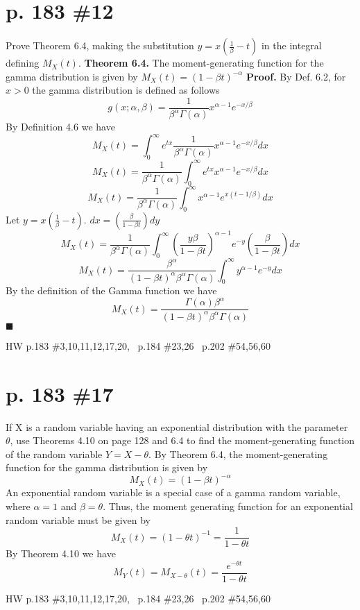 \documentclass[12pt]{article}
\begin{document}
	\section[20pt]{p. 183 \#12}
	Prove Theorem 6.4, making the substitution \(y=x\left(\frac{1}{\beta}-t\right)\) in the integral defining \(M_X(t)\). \newline \newline
	\textbf{Theorem 6.4.} The moment-generating function for the gamma distribution is given by
	\(M_X(t) = (1-\beta t)^{-\alpha}\) \newline
	\textbf{Proof.} \newline
	By Def. 6.2, for \(x>0\) the gamma distribution is defined as follows
	\[g(x;\alpha,\beta)=\frac{1}{\beta^\alpha\Gamma(\alpha)}x^{\alpha-1}e^{-x/\beta}\]
	By Definition 4.6 we have
	\[M_X(t)=\int_{0}^{\infty}e^{tx}\frac{1}{\beta^\alpha\Gamma(\alpha)}x^{\alpha-1}e^{-x/\beta}dx\]
	\[M_X(t)=\frac{1}{\beta^\alpha\Gamma(\alpha)}\int_{0}^{\infty}e^{tx}x^{\alpha-1}e^{-x/\beta}dx\]
	\[M_X(t)=\frac{1}{\beta^\alpha\Gamma(\alpha)}\int_{0}^{\infty}x^{\alpha-1}e^{x(t-1/\beta)}dx\]
	Let \(y=x\left(\frac{1}{\beta}-t\right)\). \(dx = \left(\frac{\beta}{1-\beta t}\right)dy\)
	\[M_X(t)=\frac{1}{\beta^\alpha\Gamma(\alpha)}\int_{0}^{\infty}(\frac{y\beta}{1-\beta t})^{\alpha-1}e^{-y}\left(\frac{\beta}{1-\beta t}\right)dx\]
	\[M_X(t)=\frac{\beta^{\alpha}}{(1-\beta t)^{\alpha}\beta^\alpha\Gamma(\alpha)}\int_{0}^{\infty}y^{\alpha-1}e^{-y}dx\]
	By the definition of the Gamma function we have
	\[M_X(t)=\frac{\Gamma(\alpha)\beta^{\alpha}}{(1-\beta t)^{\alpha}\beta^\alpha\Gamma(\alpha)}\]
	\newline
	\newline
	\(\blacksquare\)
	\newpage
	\maketitle HW p.183 \#3,10,11,12,17,20, \ p.184 \#23,26 \ p.202 \#54,56,60
	\section[20pt]{p. 183 \#17}
	If X is a random variable having an exponential distribution with the parameter \(\theta\), use Theorems 4.10 on page 128 and 6.4 to find the moment-generating function of the random variable \(Y=X-\theta\).
	\newline \newline
	By Theorem 6.4, the moment-generating function for the gamma distribution is given by
	\[M_X(t)=(1-\beta t)^{-\alpha}\]
	An exponential random variable is a special case of a gamma random variable, where  \(\alpha=1\) and \(\beta=\theta\). Thus, the moment generating function for an exponential random variable must be given by
	\[M_X(t)=(1-\theta t)^{-1}=\frac{1}{1-\theta t}\]
	By Theorem 4.10 we have
	\[M_Y(t)=M_{X-\theta}(t)=\frac{e^{-\theta t}}{1-\theta t}\]
	\newpage
	\maketitle HW p.183 \#3,10,11,12,17,20, \ p.184 \#23,26 \ p.202 \#54,56,60
\end{document}
